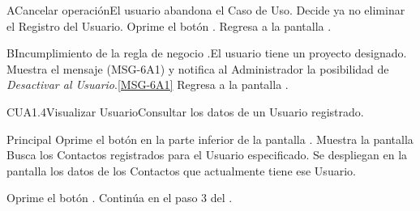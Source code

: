 		\begin{UCtrayectoriaA}{A}{Cancelar operación}{El usuario abandona el Caso de Uso.}
			\UCpaso[\UCactor] Decide ya no eliminar el Registro del Usuario.
			\UCpaso[\UCactor] Oprime el botón .
			\UCpaso Regresa a la pantalla .
		\end{UCtrayectoriaA}

		\begin{UCtrayectoriaA}{B}{Incumplimiento de la regla de negocio .}{El usuario tiene un proyecto designado.}	
			\UCpaso Muestra el mensaje (MSG-6A1) y notifica al Administrador la posibilidad de \textit{Desactivar al Usuario}.\ref{MSG-6A1}
			\UCpaso Regresa a la pantalla .
		\end{UCtrayectoriaA}


  \begin{UseCase}{CUA1.4}{Visualizar Usuario}{Consultar los datos de un Usuario registrado.}
  \end{UseCase}

  \begin{UCtrayectoria}{Principal}
      \UCpaso[\UCactor] Oprime el botón  en la parte inferior de la pantalla .
      \UCpaso Muestra la pantalla 
	\UCpaso Busca los Contactos registrados para el Usuario especificado.\label{paso:CU2BuscarContactos}
			\UCpaso Se despliegan en la pantalla los datos de los Contactos que actualmente tiene ese Usuario.

      \UCpaso [\UCactor] Oprime el botón .
      \UCpaso Continúa en el paso 3 del .
  \end{UCtrayectoria}

